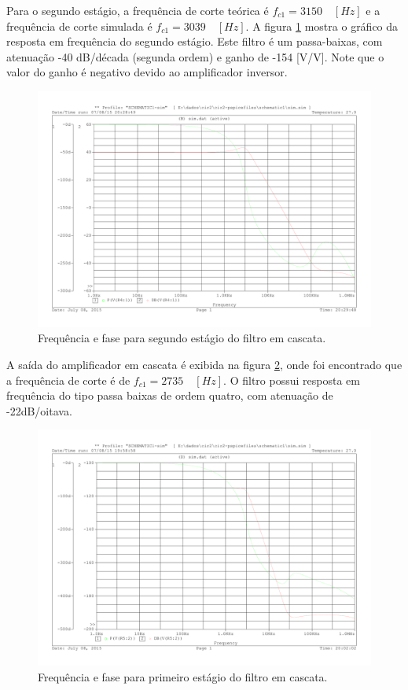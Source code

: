 Para o segundo estágio, a frequência de corte teórica é $f_{c1} = 3150 \quad [Hz]$ e a frequência de corte simulada é $f_{c1} = 3039 \quad [Hz]$. A figura \ref{f_bode3} mostra o gráfico da resposta em frequência do segundo estágio. Este filtro é um passa-baixas, com atenuação -40 dB/década (segunda ordem) e ganho de -154 [V/V].
Note que o valor do ganho é negativo devido ao amplificador inversor.

\begin{figure}[H]
\centering
\includegraphics[scale=0.5]{Imagens/bode3.pdf}
\caption{Frequência e fase para segundo estágio do filtro em cascata.}
\label{f_bode3}
\end{figure}

A saída do amplificador em cascata é exibida na figura \ref{f_bode4}, onde foi encontrado que a frequência de corte é de $f_{c1} = 2735 \quad [Hz]$. O filtro possui resposta em frequência do tipo passa baixas de ordem quatro, com atenuação de -22dB/oitava.

\begin{figure}[H]
\centering
\includegraphics[scale=0.5]{Imagens/bode4.pdf}
\caption{Frequência e fase para primeiro estágio do filtro em cascata.}
\label{f_bode4}
\end{figure}

